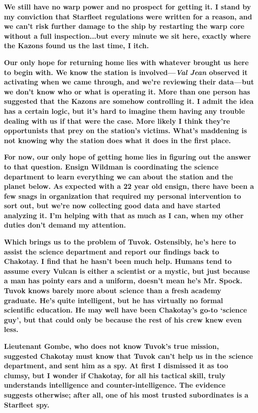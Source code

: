 \documentclass[twoside,letterpaper,12pt]{memoir}
\begin{document}
\textbf{We still have no warp power and no prospect for getting it. I stand by my conviction that Starfleet regulations were written for a reason, and we can't risk further damage to the ship by restarting the warp core without a full inspection...but every minute we sit here, exactly where the Kazons found us the last time, I itch.}

\textbf{Our only hope for returning home lies with whatever brought us here to begin with. We know the station is involved—\textit{Val Jean }observed it activating when we came through, and we’re reviewing their data—but we don’t know who or what is operating it. More than one person has suggested that the Kazons are somehow controlling it. I admit the idea has a certain logic, but it’s hard to imagine them having any trouble dealing with us if that were the case. More likely I think they’re opportunists that prey on the station’s victims. What’s maddening is not knowing why the station does what it does in the first place.}

\textbf{For now, our only hope of getting home lies in figuring out the answer to that question. Ensign Wildman is coordinating the science department to learn everything we can about the station and the planet below. As expected with a 22 year old ensign, there have been a few snags in organization that required my personal intervention to sort out, but we're now collecting good data and have started analyzing it. I'm helping with that as much as I can, when my other duties don't demand my attention.}

\textbf{Which brings us to the problem of Tuvok. Ostensibly, he's here to assist the science department and report our findings back to Chakotay. I find that he hasn't been much help. Humans tend to assume every Vulcan is either a scientist or a mystic, but just because a man has pointy ears and a uniform, doesn't mean he's Mr. Spock. Tuvok knows barely more about science than a fresh academy graduate. He’s quite intelligent, but he has virtually no formal scientific education. He may well have been Chakotay's go-to `science guy', but that could only be because the rest of his crew knew even less. }

\textbf{Lieutenant Gombe, who does not know Tuvok's true mission, suggested Chakotay must know that Tuvok can't help us in the science department, and sent him as a spy. At first I dismissed it as too clumsy, but I wonder if Chakotay, for all his tactical skill, truly understands intelligence and counter-intelligence. The evidence suggests otherwise; after all, one of his most trusted subordinates is a Starfleet spy.}
\end{document}
